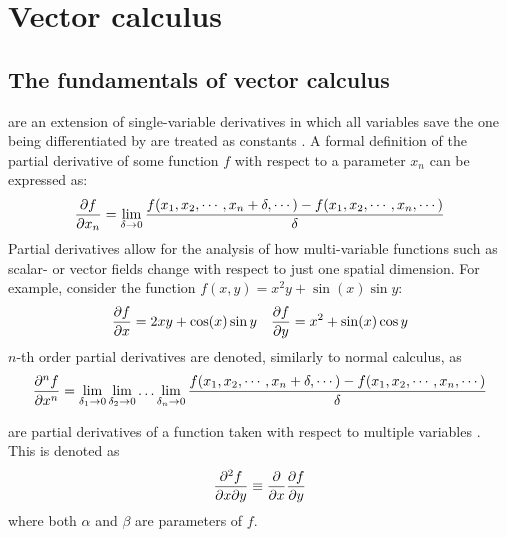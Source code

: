 \section{Vector calculus}
\subsection{The fundamentals of vector calculus}

\begin{defn}
	 are an extension of single-variable derivatives in which all variables save
	the one being differentiated by are treated as constants \cite{MORTIMER201389}. A formal definition of the
	partial derivative of some function $f$ with respect to a parameter $x_n$ can be expressed as:
	\begin{equation}
		\pdv{f}{x_n}=\lim_{\delta\rightarrow0}\frac{f(x_1,x_2,\cdots,x_n+\delta,\cdots)-f(x_1,x_2,\cdots,x_n,\cdots)}{\delta}
	\end{equation}
	Partial derivatives allow for the analysis of how multi-variable functions such as scalar- or vector fields change
	with respect to just one spatial dimension. For example, consider the function $f(x,y)=x^2y+\sin(x)\sin y$:
	\begin{align*}
		\pdv{f}{x}=2xy+\cos(x)\sin y&&\pdv{f}{y}=x^2+\sin(x)\cos y
	\end{align*}
	$n$-th order partial derivatives are denoted, similarly to normal calculus, as
	$$
	\pdv[n]{f}{x}=\lim_{\delta_1\rightarrow0}\lim_{\delta_2\rightarrow0}\hdots\lim_{\delta_n\rightarrow0}\frac{f(x_1,x_2,\cdots,x_n+\delta,\cdots)-f(x_1,x_2,\cdots,x_n,\cdots)}{\delta}
	$$
\end{defn}
\begin{defn}
	 are partial derivatives of a function taken with respect to multiple
	variables \cite{GARRETT2015377}. This is denoted as
	$$
	\pdv{f}{x}{y}\equiv\pdv{x}\pdv{f}{y}
	$$
	where both $\alpha$ and $\beta$ are parameters of $f$.
\end{defn}
